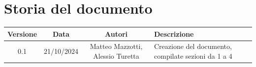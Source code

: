 \documentclass[10pt]{article}
\begin{document}
    \section{Storia del documento}
    \begin{center}
        \begin{tabular}{ |c|c|c|p{5cm}| } 
         \hline
         Versione & Data & Autori & Descrizione \\ 
         \hline
         0.1 & 21/10/2024 & Matteo Mazzotti, Alessio Turetta & Creazione del documento, compilate sezioni da 1 a 4 \\ 
         \hline
        \end{tabular}
    \end{center}
\end{document}
